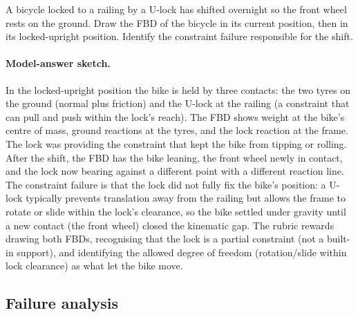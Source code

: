 \begin{exercise}
A bicycle locked to a railing by a U-lock has shifted overnight so
the front wheel rests on the ground. Draw the FBD of the bicycle in
its current position, then in its locked-upright position. Identify
the constraint failure responsible for the shift.
\paragraph{Model-answer sketch.} In the locked-upright position the bike
is held by three contacts: the two tyres on the ground (normal plus
friction) and the U-lock at the railing (a constraint that can pull and
push within the lock's reach). The FBD shows weight at the bike's centre
of mass, ground reactions at the tyres, and the lock reaction at the
frame. The lock was providing the constraint that kept the bike from
tipping or rolling. After the shift, the FBD has the bike leaning, the
front wheel newly in contact, and the lock now bearing against a
different point with a different reaction line. The constraint failure is
that the lock did not fully fix the bike's position: a U-lock typically
prevents translation away from the railing but allows the frame to
rotate or slide within the lock's clearance, so the bike settled under
gravity until a new contact (the front wheel) closed the kinematic gap.
The rubric rewards drawing both FBDs, recognising that the lock is a
partial constraint (not a built-in support), and identifying the
allowed degree of freedom (rotation/slide within lock clearance) as what
let the bike move.
\end{exercise}

\subsection*{Failure analysis}

